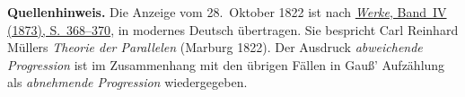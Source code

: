 \par\medskip\begin{small}\noindent\textbf{Quellenhinweis.} Die Anzeige vom 28.~Oktober 1822 ist nach \href{https://gdz.sub.uni-goettingen.de/id/PPN236005081}{\textit{Werke}, Band~IV (1873), S.~368--370}, in modernes Deutsch übertragen. Sie bespricht Carl Reinhard Müllers \textit{Theorie der Parallelen} (Marburg 1822). Der Ausdruck \textit{abweichende Progression} ist im Zusammenhang mit den übrigen Fällen in Gauß' Aufzählung als \textit{abnehmende Progression} wiedergegeben.\par\end{small}
